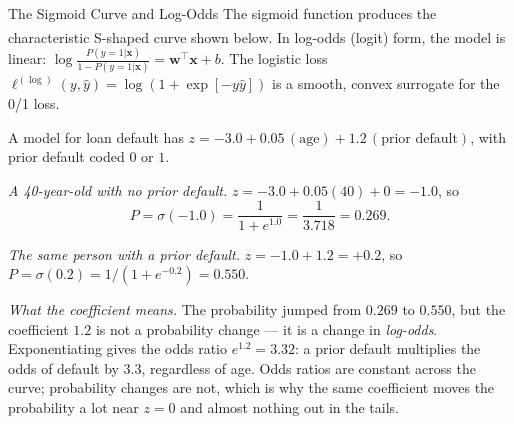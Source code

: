 \begin{v3topic}{The Sigmoid Curve and Log-Odds}
    The sigmoid function produces the characteristic S-shaped curve shown below\textsuperscript{\cite[][p.89]{iiiCourseMachineLearning}}. In log-odds (logit) form, the model is linear: $\log\frac{P(y=1|\mathbf{x})}{1-P(y=1|\mathbf{x})} = \mathbf{w}^\top\mathbf{x} + b$. The logistic loss $\ell^{(\log)}(y,\hat{y}) = \log(1 + \exp[-y\hat{y}])$ is a smooth, convex surrogate for the 0/1 loss.
\visualseparator
\label{fig:ml-sigmoid}

\begin{workedexample}
A model for loan default has $z = -3.0 + 0.05\,(\text{age}) + 1.2\,
(\text{prior default})$, with prior default coded $0$ or $1$.

\emph{A 40-year-old with no prior default.}
$z = -3.0 + 0.05(40) + 0 = -1.0$, so
\[
  P = \sigma(-1.0) = \frac{1}{1+e^{1.0}} = \frac{1}{3.718} = 0.269 .
\]

\emph{The same person with a prior default.}
$z = -1.0 + 1.2 = +0.2$, so $P = \sigma(0.2) = 1/(1+e^{-0.2}) = 0.550$.

\emph{What the coefficient means.} The probability jumped from $0.269$ to
$0.550$, but the coefficient $1.2$ is not a probability change --- it is a
change in \emph{log-odds}. Exponentiating gives the odds ratio
$e^{1.2} = 3.32$: a prior default multiplies the odds of default by $3.3$,
regardless of age. Odds ratios are constant across the curve; probability
changes are not, which is why the same coefficient moves the probability a lot
near $z=0$ and almost nothing out in the tails.
\end{workedexample}
\end{v3topic}

